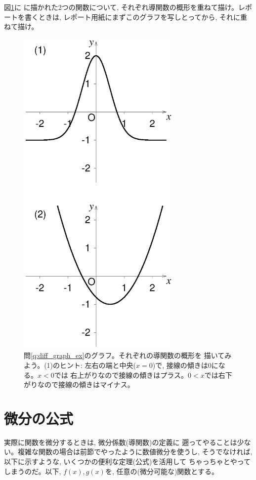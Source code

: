 \begin{q}\label{q:diff_graph_ex} 図\ref{fig:diff_graph_ex}に
に描かれた2つの関数について, それぞれ導関数の概形を重ねて描け。レポートを書くときは, 
レポート用紙にまずこのグラフを写しとってから, それに重ねて描け。
\end{q}
\begin{figure}[!h]
    \centering
    \includegraphics[width=8cm]{diff_graph_ex.eps}
    \caption{問\ref{q:diff_graph_ex}のグラフ。それぞれの導関数の概形を
描いてみよう。(1)のヒント: 左右の端と中央($x=0$)で, 接線の傾きは0になる。$x<0$では
右上がりなので接線の傾きはプラス。$0<x$では右下がりなので接線の傾きはマイナス。
\label{fig:diff_graph_ex}}
\end{figure}
\hv


\section{微分の公式}\label{sect:diff_formula}

実際に関数を微分するときは, 微分係数(導関数)の定義に
遡ってやることは少ない。複雑な関数の場合は前節でやったように数値微分を使うし, 
そうでなければ, 以下に示すような, いくつかの便利な定理(公式)を活用して
ちゃっちゃとやってしまうのだ。以下, $f(x), g(x)$を, 任意の(微分可能な)関数とする。
\hv

